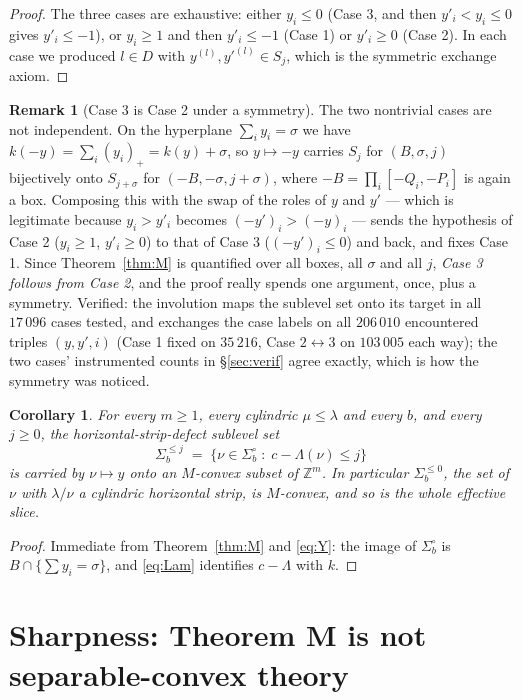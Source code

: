 \documentclass[11pt]{article}
\theoremstyle{plain}
\newtheorem{corollary}[theorem]{Corollary}
\theoremstyle{definition}
\newtheorem{remark}[theorem]{Remark}
\newcommand{\Z}{\mathbb{Z}}
\newcommand{\pospart}[1]{\left(#1\right)_{+}}
\begin{document}
\begin{proof}
The three cases are exhaustive: either $y_i\le 0$ (Case 3, and then $y'_i<y_i\le0$ gives
$y'_i\le-1$), or $y_i\ge1$ and then $y'_i\le-1$ (Case 1) or $y'_i\ge0$ (Case 2). In each
case we produced $l\in D$ with $y^{(l)},y'^{(l)}\in S_j$, which is the symmetric exchange
axiom.
\end{proof}

\begin{remark}[Case 3 is Case 2 under a symmetry]\label{rem:involution}
The two nontrivial cases are not independent. On the hyperplane $\sum_i y_i=\sigma$ we have
$k(-y)=\sum_i\pospart{y_i}=k(y)+\sigma$, so $y\mapsto-y$ carries $S_j$ for $(B,\sigma,j)$
bijectively onto $S_{j+\sigma}$ for $(-B,-\sigma,j+\sigma)$, where
$-B=\prod_i[-Q_i,-P_i]$ is again a box. Composing this with the swap of the roles of $y$
and $y'$ --- which is legitimate because $y_i>y'_i$ becomes $(-y')_i>(-y)_i$ --- sends the
hypothesis of Case 2 ($y_i\ge1$, $y'_i\ge0$) to that of Case 3 ($(-y')_i\le0$) and back,
and fixes Case 1. Since Theorem~\ref{thm:M} is quantified over all boxes, all $\sigma$ and
all $j$, \emph{Case 3 follows from Case 2}, and the proof really spends one argument, once,
plus a symmetry. Verified: the involution maps the sublevel set onto its target in all
$17\,096$ cases tested, and exchanges the case labels on all $206\,010$ encountered
triples $(y,y',i)$ (Case 1 fixed on $35\,216$, Case $2\leftrightarrow3$ on $103\,005$ each
way); the two cases' instrumented counts in \S\ref{sec:verif} agree exactly, which is how
the symmetry was noticed.
\end{remark}

\begin{corollary}\label{cor:slices}
For every $m\ge1$, every cylindric $\mu\le\lambda$ and every $b$, and every $j\ge0$, the
horizontal-strip-defect sublevel set
\[
   \Sigma_b^{\le j}\;=\;\bigl\{\nu\in\Sigma_b^\circ\;:\;c-\Lambda(\nu)\le j\bigr\}
\]
is carried by $\nu\mapsto y$ onto an $M$-convex subset of $\Z^m$. In particular
$\Sigma_b^{\le 0}$, the set of $\nu$ with $\lambda/\nu$ a cylindric horizontal strip, is
$M$-convex, and so is the whole effective slice.
\end{corollary}

\begin{proof}
Immediate from Theorem~\ref{thm:M} and \eqref{eq:Y}: the image of $\Sigma_b^\circ$ is
$B\cap\{\sum y_i=\sigma\}$, and \eqref{eq:Lam} identifies $c-\Lambda$ with $k$.
\end{proof}

\section{Sharpness: Theorem M is not separable-convex theory}\label{sec:sharp}
\end{document}
